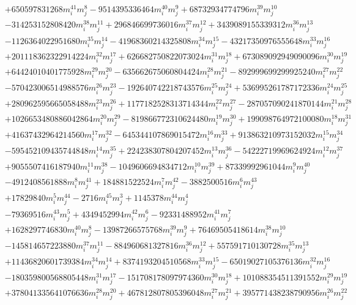 {\begin{align*}
&+650597831268m_i^{41}m_j^{8}-9514395336464m_i^{40}m_j^{9}+68732934774796m_i^{39}m_j^{10}\\
&-314253152808420m_i^{38}m_j^{11}+296846699736016m_i^{37}m_j^{12}+3439089155339312m_i^{36}m_j^{13}\\
&-1126364022951680m_i^{35}m_j^{14}-41968360214325808m_i^{34}m_j^{15}-43217350976555648m_i^{33}m_j^{16}\\
&+201118362322914224m_i^{32}m_j^{17}+626682750822073024m_i^{31}m_j^{18}+673089092949090096m_i^{30}m_j^{19}\\
&+64424010401775928m_i^{29}m_j^{20}-635662675060804424m_i^{28}m_j^{21}-892999699299925240m_i^{27}m_j^{22}\\
&-570423006514988576m_i^{26}m_j^{23}-192640742218743576m_i^{25}m_j^{24}+536995261787172336m_i^{24}m_j^{25}\\
&+280962595665058488m_i^{23}m_j^{26}+1177182528313714344m_i^{22}m_j^{27}-287057090241870144m_i^{21}m_j^{28}\\
&+1026653480886042864m_i^{20}m_j^{29}-819866772310624480m_i^{19}m_j^{30}+199098764972100080m_i^{18}m_j^{31}\\
&+41637432964214560m_i^{17}m_j^{32}-645344107869015472m_i^{16}m_j^{33}+913863210973152032m_i^{15}m_j^{34}\\
&-595452109435744848m_i^{14}m_j^{35}+224238307804207452m_i^{13}m_j^{36}-54222719969624924m_i^{12}m_j^{37}\\
&+9055507416187940m_i^{11}m_j^{38}-1049606694834712m_i^{10}m_j^{39}+87339992961044m_i^{9}m_j^{40}\\
&-4912408561888m_i^{8}m_j^{41}+184881522524m_i^{7}m_j^{42}-3882500516m_i^{6}m_j^{43}\\
&+17829840m_i^{5}m_j^{44}-2716m_i^{45}m_j^{3}+1145378m_i^{44}m_j^{4}\\
&-79369516m_i^{43}m_j^{5}+4349452994m_i^{42}m_j^{6}-92331488952m_i^{41}m_j^{7}\\
&+1628297746830m_i^{40}m_j^{8}-13987266575768m_i^{39}m_j^{9}+76469505418614m_i^{38}m_j^{10}\\
&-145814657223880m_i^{37}m_j^{11}-884960681327816m_i^{36}m_j^{12}+557591710130728m_i^{35}m_j^{13}\\
&+11436820601739384m_i^{34}m_j^{14}+8374193204510568m_i^{33}m_j^{15}-65019027105376136m_i^{32}m_j^{16}\\
&-180359800568805448m_i^{31}m_j^{17}-151708178097974360m_i^{30}m_j^{18}+101088354511391552m_i^{29}m_j^{19}\\
&+378041335641076636m_i^{28}m_j^{20}+467812807805396048m_i^{27}m_j^{21}+395771438238790956m_i^{26}m_j^{22}\\

\end{align*}}
